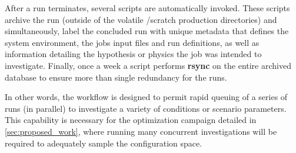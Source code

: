 After a run terminates, several scripts are automatically invoked. 
These scripts archive the run (outside of the volatile /scratch 
production directories) and simultaneously, label the concluded run with
unique metadata that defines the system environment, the jobs input
files and run definitions, as well as information detailing the
hypothesis or physics the job was intended to investigate. Finally, once
a week a script performs \textbf{rsync} on the entire archived database to
ensure more than single redundancy for the runs. 

In other words, the workflow is designed to permit rapid queuing of a
series of runs (in parallel) to investigate a variety of conditions or
scenario parameters. This capability is necessary for the optimization
campaign detailed in \ref{sec:proposed_work}, where running many
concurrent investigations will be required to adequately sample the
configuration space.  
